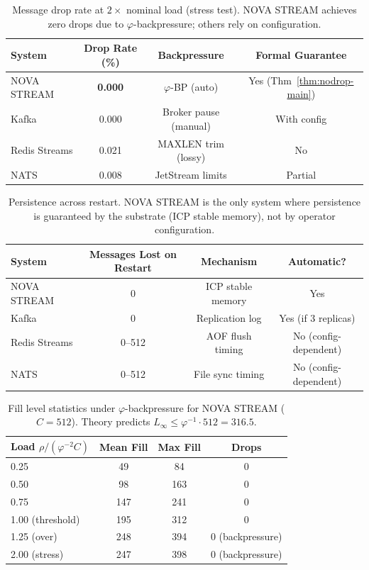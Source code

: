 \documentclass[12pt]{article}
\newcommand{\PHIINV}{\varphi^{-1}}
\newcommand{\AMOR}{\varphi^{-2}}
\newcommand{\SCAP}{C}
\newcommand{\load}{\rho}
\begin{document}
\begin{table}[h]
\centering
\caption{Message drop rate at $2\times$ nominal load (stress test).  NOVA STREAM
  achieves zero drops due to $\varphi$-backpressure; others rely on
  configuration.}
\label{tab:drops}
\begin{tabular}{@{}lccc@{}}
\toprule
\textbf{System} & \textbf{Drop Rate (\%)} & \textbf{Backpressure} &
  \textbf{Formal Guarantee} \\
\midrule
NOVA STREAM   & \textbf{0.000} & $\varphi$-BP (auto)    & Yes (Thm~\ref{thm:nodrop-main}) \\
Kafka         & 0.000          & Broker pause (manual)  & With config \\
Redis Streams & 0.021          & MAXLEN trim (lossy)    & No \\
NATS          & 0.008          & JetStream limits       & Partial \\
\bottomrule
\end{tabular}
\end{table}

\begin{table}[h]
\centering
\caption{Persistence across restart.  NOVA STREAM is the only system where
  persistence is guaranteed by the substrate (ICP stable memory), not by operator
  configuration.}
\label{tab:persist}
\begin{tabular}{@{}lccc@{}}
\toprule
\textbf{System} & \textbf{Messages Lost on Restart} & \textbf{Mechanism} &
  \textbf{Automatic?} \\
\midrule
NOVA STREAM   & 0     & ICP stable memory      & Yes \\
Kafka         & 0     & Replication log        & Yes (if 3 replicas) \\
Redis Streams & 0--512 & AOF flush timing      & No (config-dependent) \\
NATS          & 0--512 & File sync timing      & No (config-dependent) \\
\bottomrule
\end{tabular}
\end{table}

\begin{table}[h]
\centering
\caption{Fill level statistics under $\varphi$-backpressure for NOVA STREAM
  ($\SCAP = 512$).  Theory predicts $L_\infty \le \PHIINV \cdot 512 = 316.5$.}
\label{tab:fill}
\begin{tabular}{@{}lccc@{}}
\toprule
\textbf{Load $\load / (\AMOR \SCAP)$} & \textbf{Mean Fill} &
  \textbf{Max Fill} & \textbf{Drops} \\
\midrule
0.25 & 49  & 84  & 0 \\
0.50 & 98  & 163 & 0 \\
0.75 & 147 & 241 & 0 \\
1.00 (threshold) & 195 & 312 & 0 \\
1.25 (over)      & 248 & 394 & 0 (backpressure) \\
2.00 (stress)    & 247 & 398 & 0 (backpressure) \\
\bottomrule
\end{tabular}
\end{table}
\end{document}
